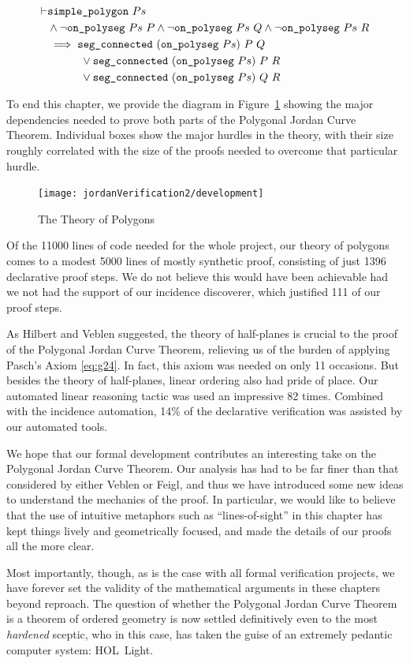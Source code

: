 \begin{align*}
\vdash &\code{simple\_polygon}\ Ps\\
       &\wedge \neg\code{on\_polyseg}\ Ps\ P\wedge \neg\code{on\_polyseg}\ Ps\ Q\wedge \neg\code{on\_polyseg}\ Ps\ R\\
       &\implies \code{seg\_connected}\ (\code{on\_polyseg}\ Ps)\ P\ Q\\
       &\qquad\quad\vee \code{seg\_connected}\ (\code{on\_polyseg}\ Ps)\ P\ R\\
       &\qquad\quad\vee \code{seg\_connected}\ (\code{on\_polyseg}\ Ps)\ Q\ R
\end{align*}

To end this chapter, we provide the diagram in Figure~\ref{fig:JordanTheoryOutline} showing the major dependencies needed to prove both parts of the Polygonal Jordan Curve Theorem. Individual boxes show the major hurdles in the theory, with their size roughly correlated with the size of the proofs needed to overcome that particular hurdle. 

\begin{figure}
\texttt{[image: jordanVerification2/development]}
\caption{The Theory of Polygons}
\label{fig:JordanTheoryOutline}
\end{figure}

Of the 11000 lines of code needed for the whole project, our theory of polygons comes to a modest 5000 lines of mostly synthetic proof, consisting of just 1396 declarative proof steps. We do not believe this would have been achievable had we not had the support of our incidence discoverer, which justified 111 of our proof steps. 

As Hilbert and Veblen suggested, the theory of half-planes is crucial to the proof of the Polygonal Jordan Curve Theorem, relieving us of the burden of applying Pasch's Axiom \eqref{eq:g24}. In fact, this axiom was needed on only 11 occasions. But besides the theory of half-planes, linear ordering also had pride of place. Our automated linear reasoning tactic was used an impressive 82 times. Combined with the incidence automation, 14\% of the declarative verification was assisted by our automated tools.

We hope that our formal development contributes an interesting take on the Polygonal Jordan Curve Theorem. Our analysis has had to be far finer than that considered by either Veblen or Feigl, and thus we have introduced some new ideas to understand the mechanics of the proof. In particular, we would like to believe that the use of intuitive metaphors such as ``lines-of-sight'' in this chapter has kept things lively and geometrically focused, and made the details of our proofs all the more clear. 

Most importantly, though, as is the case with all formal verification projects, we have forever set the validity of the mathematical arguments in these chapters beyond reproach. The question of whether the Polygonal Jordan Curve Theorem is a theorem of ordered geometry is now settled definitively even to the most \emph{hardened} sceptic, who in this case, has taken the guise of an extremely pedantic computer system: HOL~Light.

